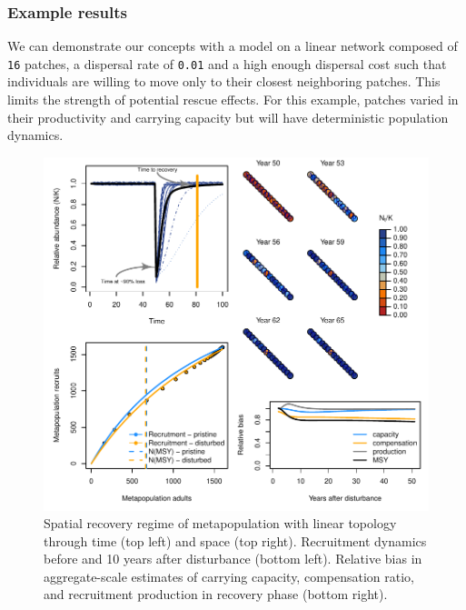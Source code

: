 \documentclass[]{article}
\begin{document}
\subsubsection{Example results}\label{example-results}

We can demonstrate our concepts with a model on a linear network
composed of \texttt{16} patches, a dispersal rate of \texttt{0.01} and a
high enough dispersal cost such that individuals are willing to move
only to their closest neighboring patches. This limits the strength of
potential rescue effects. For this example, patches varied in their
productivity and carrying capacity but will have deterministic
population dynamics.

\begin{figure}[H]

{\centering \includegraphics{Managing_for_ecological_surprises_in_metapopulations_makeHTML_files/figure-latex/example results1-1} 

}

\caption{Spatial recovery regime of metapopulation with linear topology through time (top left) and space (top right). Recruitment dynamics before and 10 years after disturbance (bottom left). Relative bias in aggregate-scale estimates of carrying capacity, compensation ratio, and recruitment production in recovery phase (bottom right).}\label{fig:example results1}
\end{figure}
\end{document}
